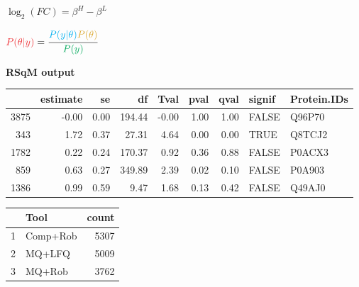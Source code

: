 \documentclass[10pt, a4paper, twocolumn]{article} %
\begin{document}
$\log_2(FC) = \beta^{H} - \beta^{L}$

$\color{myRed}P(\theta | y)\color{black} = \cfrac{\color{myBlue}P(y | \theta) \color{orange} P(\theta)}{\color{myGreen}P(y)}$
\color{black}

\textbf{RSqM output}

\begin{table}[ht]
\centering
\begin{tabular}{rrrrrrrll}
  \hline
 & estimate & se & df & Tval & pval & qval & signif & Protein.IDs \\ 
  \hline
3875 & -0.00 & 0.00 & 194.44 & -0.00 & 1.00 & 1.00 & FALSE & Q96P70 \\ 
  343 & 1.72 & 0.37 & 27.31 & 4.64 & 0.00 & 0.00 & TRUE & Q8TCJ2 \\ 
  1782 & 0.22 & 0.24 & 170.37 & 0.92 & 0.36 & 0.88 & FALSE & P0ACX3 \\ 
  859 & 0.63 & 0.27 & 349.89 & 2.39 & 0.02 & 0.10 & FALSE & P0A903 \\ 
  1386 & 0.99 & 0.59 & 9.47 & 1.68 & 0.13 & 0.42 & FALSE & Q49AJ0 \\ 
   \hline
\end{tabular}
\end{table}


\begin{table}[ht]
\centering
\begin{tabular}{rlr}
  \hline
 & Tool & count \\ 
  \hline
1 & Comp+Rob & 5307 \\ 
  2 & MQ+LFQ & 5009 \\ 
  3 & MQ+Rob & 3762 \\ 
   \hline
\end{tabular}
\end{table}
\end{document}
